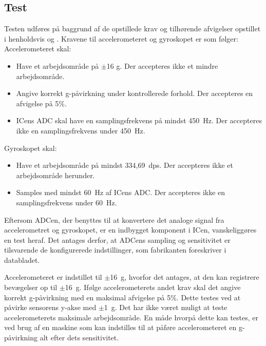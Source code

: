 \subsection{Test}
Testen udføres på baggrund af de opstillede krav og tilhørende afvigelser opstillet i henholdsvis  og . Kravene til accelerometeret og gyroskopet er som følger:\\
Accelerometeret skal:
\begin{itemize}
\item Have et arbejdsområde på $\pm$16 g. Der accepteres ikke et mindre arbejdsområde.
\item Angive korrekt g-påvirkning under kontrollerede forhold. Der accepteres en afvigelse på 5\%.
\item ICens ADC skal have en samplingsfrekvens på mindst 450~Hz. Der accepteres ikke en samplingsfrekvens under 450~Hz.
\end{itemize}
Gyroskopet skal:
\begin{itemize}
\item Have et arbejdsområde på mindst 334,69~dps. Der accepteres ikke et arbejdsområde herunder.
\item Samples med mindst 60~Hz af ICens ADC. Der accepteres ikke en samplingsfrekvens under 60~Hz.
\end{itemize}
Eftersom ADCen, der benyttes til at konvertere det analoge signal fra accelerometret og gyroskopet, er en indbygget komponent i ICen, vanskeliggøres en test heraf. Det antages derfor, at ADCens sampling og sensitivitet er tilsvarende de konfigurerede indstillinger, som fabrikanten foreskriver i databladet.~\citep{STMicroelectronics2016}

Accelerometeret er indstillet til $\pm$16~g, hvorfor det antages, at den kan registrere bevægelser op til $\pm$16~g. Ifølge accelerometerets andet krav skal det angive korrekt g-påvirkning med en maksimal afvigelse på 5\%. Dette testes ved at påvirke sensorens y-akse med $\pm$1~g. Det har ikke været muligt at teste accelerometerets maksimale arbejdsområde. En måde hvorpå dette kan testes, er ved brug af en maskine som kan indstilles til at påføre accelerometeret en g-påvirkning alt efter dets sensitivitet. 


